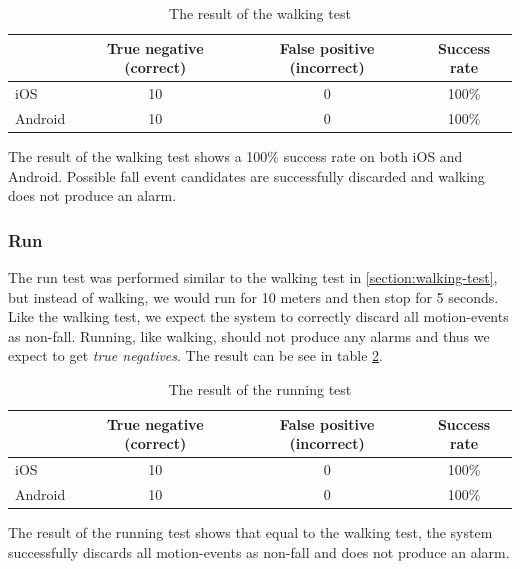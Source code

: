 \documentclass[12pt, a4paper, onecolumn]{article}
\begin{document}
	\begin{table}[H]
		\centering
		\begin{tabular}{|l|c|c|c|}
			\hline
			& True negative (correct) & False positive (incorrect) & Success rate \\ \hline
			iOS     & 10            & 0              & 100\%        \\ \hline
			Android & 10            & 0              & 100\%        \\ \hline
		\end{tabular}
		\caption{The result of the walking test}
		\label{table:walk-test}
	\end{table}
	
	The result of the walking test shows a 100\% success rate on both iOS and Android. Possible fall event candidates are successfully discarded and walking does not produce an alarm.
	
	
	\subsubsection{Run}
	The run test was performed similar to the walking test in \ref{section:walking-test}, but instead of walking, we would run for 10 meters and then stop for 5 seconds. Like the walking test, we expect the system to correctly discard all motion-events as non-fall. Running, like walking, should not produce any alarms and thus we expect to get \textit{true negatives}. The result can be see in table \ref{table:run-test}.
	
	
	\begin{table}[H]
		\centering
		\begin{tabular}{|l|c|c|c|}
			\hline
			& True negative (correct) & False positive (incorrect)& Success rate \\ \hline
			iOS     & 10            & 0              & 100\%        \\ \hline
			Android & 10            & 0              & 100\%        \\ \hline
		\end{tabular}
		\caption{The result of the running test}
		\label{table:run-test}
	\end{table}
	
	The result of the running test shows that equal to the walking test, the system successfully discards all motion-events as non-fall and does not produce an alarm.
	
	
\end{document}
